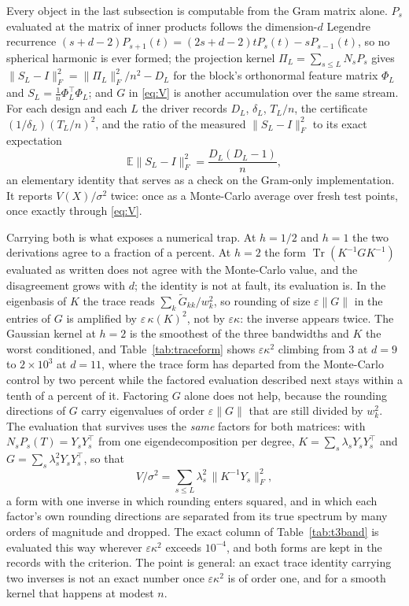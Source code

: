 \documentclass[11pt]{article}
\theoremstyle{definition}
\DeclareMathOperator{\Tr}{Tr}
\newcommand{\E}{\mathbb{E}}
\begin{document}
Every object in the last subsection is computable from the Gram matrix alone. $P_s$ evaluated at the
matrix of inner products follows the dimension-$d$ Legendre recurrence
$(s+d-2)P_{s+1}(t)=(2s+d-2)tP_s(t)-sP_{s-1}(t)$, so no spherical harmonic is ever formed; the
projection kernel $\Pi_L=\sum_{s\le L}N_sP_s$ gives $\|S_L-I\|_F^2=\|\Pi_L\|_F^2/n^2-D_L$ for the
block's orthonormal feature matrix $\Phi_L$ and $S_L=\frac1n\Phi_L^\top\Phi_L$; and $G$ in
\eqref{eq:V} is another accumulation over the same stream. For each design and each $L$ the driver
records $D_L$, $\delta_L$, $T_L/n$, the certificate $(1/\delta_L)(T_L/n)^2$, and the ratio of the
measured $\|S_L-I\|_F^2$ to its exact expectation
\begin{equation}
\E\big\|S_L-I\big\|_F^2=\frac{D_L(D_L-1)}{n},
\label{eq:second}
\end{equation}
an elementary identity that serves as a check on the Gram-only implementation. It reports
$V(X)/\sigma^2$ twice: once as a Monte-Carlo average over fresh test points, once exactly through
\eqref{eq:V}.

Carrying both is what exposes a numerical trap. At $h=1/2$ and $h=1$ the two derivations agree to a
fraction of a percent. At $h=2$ the form $\Tr(K^{-1}GK^{-1})$ evaluated as written does not agree
with the Monte-Carlo value, and the disagreement grows with $d$; the identity is not at fault, its
evaluation is. In the eigenbasis of $K$ the trace reads $\sum_k \tilde G_{kk}/w_k^2$, so rounding of
size $\varepsilon\|G\|$ in the entries of $G$ is amplified by $\varepsilon\,\kappa(K)^2$, not by
$\varepsilon\kappa$: the inverse appears twice. The Gaussian kernel at $h=2$ is the smoothest of the
three bandwidths and $K$ the worst conditioned, and Table~\ref{tab:traceform} shows
$\varepsilon\kappa^2$ climbing from $3$ at $d=9$ to $2\times10^3$ at $d=11$, where the trace form has
departed from the Monte-Carlo control by two percent while the factored evaluation described next
stays within a tenth of a percent of it. Factoring $G$ alone does not help, because the rounding
directions of $G$ carry eigenvalues of order $\varepsilon\|G\|$ that are still divided by $w_k^2$.
The evaluation that survives uses the \emph{same} factors for both matrices: with
$N_sP_s(T)=Y_sY_s^{\!\top}$ from one eigendecomposition per degree, $K=\sum_s\lambda_sY_sY_s^{\!\top}$
and $G=\sum_s\lambda_s^2Y_sY_s^{\!\top}$, so that
\[
V/\sigma^2=\sum_{s\le L}\lambda_s^2\,\|K^{-1}Y_s\|_F^2 ,
\]
a form with one inverse in which rounding enters squared, and in which each factor's own rounding
directions are separated from its true spectrum by many orders of magnitude and dropped. The exact
column of Table~\ref{tab:t3band} is evaluated this way wherever $\varepsilon\kappa^2$ exceeds
$10^{-4}$, and both forms are kept in the records with the criterion. The point is general: an exact
trace identity carrying two inverses is not an exact number once $\varepsilon\kappa^2$ is of order
one, and for a smooth kernel that happens at modest $n$.
\end{document}
